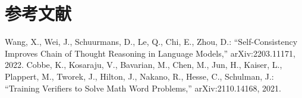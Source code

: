 \documentclass{ipsj}
\begin{document}
\section*{参考文献}
\begin{thebibliography}{9}
 Wang, X., Wei, J., Schuurmans, D., Le, Q., Chi, E., Zhou, D.: ``Self-Consistency Improves Chain of Thought Reasoning in Language Models,'' arXiv:2203.11171, 2022.
 Cobbe, K., Kosaraju, V., Bavarian, M., Chen, M., Jun, H., Kaiser, L., Plappert, M., Tworek, J., Hilton, J., Nakano, R., Hesse, C., Schulman, J.: ``Training Verifiers to Solve Math Word Problems,'' arXiv:2110.14168, 2021.
\end{thebibliography}
\end{document}
